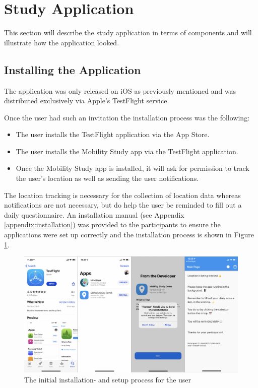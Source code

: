 \section{Study Application}
This section will describe the study application in terms of components and will illustrate how the application looked.

\subsection{Installing the Application}
The application was only released on iOS as previously mentioned and was distributed exclusively via Apple's TestFlight service. 

Once the user had such an invitation the installation process was the following: 
\begin{itemize}
    
    \item The user installs the TestFlight application via the App Store.
    
    \item The user installs the Mobility Study app via the TestFlight application.
    
    \item Once the Mobility Study app is installed, it will ask for permission to track the user's location as well as sending the user notifications. 
    
\end{itemize}
The location tracking is necessary for the collection of location data whereas notifications are not necessary, but do help the user be reminded to fill out a daily questionnaire. An installation manual (see Appendix \ref{appendix:installation}) was provided to the participants to ensure the applications were set up correctly and the installation process is shown in Figure \ref{fig:screens-install}.

\begin{figure}
    \centering
    \includegraphics[width=\textwidth]{images/app_imgs/screens-install.pdf}
    \caption{The initial installation- and setup process for the user}
    \label{fig:screens-install}
\end{figure}

